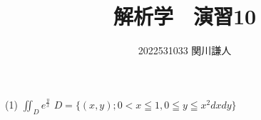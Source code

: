 \documentclass[a4paper,11pt]{ltjsarticle}
\begin{document}
\title{解析学　演習10}
\author{2022531033 関川謙人}
\maketitle
\section{}
(1)
$\iint _{D} e^{\frac{y}{x} }$
$D = \{(x,y);0<x\leqq 1,0\leqq y\leqq x^{2} dx dy\}$
\end{document}
